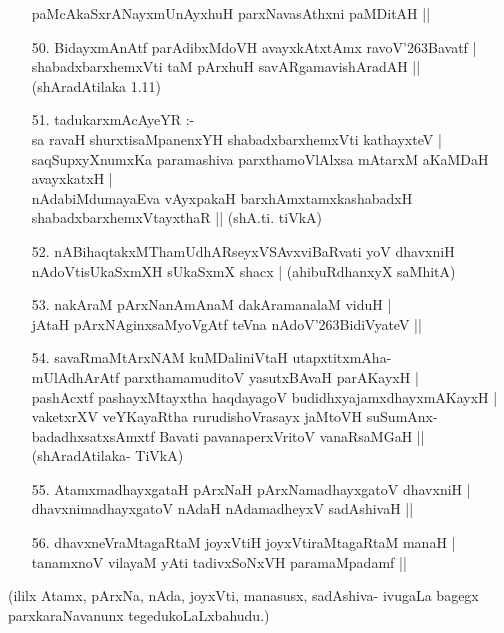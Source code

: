 \begin{itemize}
paMcAkaSxrANayxmUnAyxhuH parxNavasAthxni paMDitAH ||\label{161}
\item[50.] BidayxmAnAtf parAdibxMdoVH avayxkAtxtAmx ravoV\char'263Bavatf |\\\label{151}
shabadxbarxhemxVti taM pArxhuH savARgamavishAradAH ||
\hfill{(shAradAtilaka 1.11)}
\item[51.] tadukarxmAcAyeYR :-\\
sa ravaH shurxtisaMpanenxYH shabadxbarxhemxVti kathayxteV |\\\label{151}
saqSupxyXnumxKa paramashiva parxthamoVlAlxsa mAtarxM aKaMDaH avayxkatxH |\\
nAdabiMdumayaEva vAyxpakaH barxhAmxtamxkashabadxH shabadxbarxhemxVtayxthaR ||
\hfill{(shA.ti. tiVkA)}
\item[52.] nABihaqtakxMThamUdhARseyxVSAvxviBaRvati yoV dhavxniH \\\label{151}
nAdoVtisUkaSxmXH sUkaSxmX shacx |
\hfill{(ahibuRdhanxyX saMhitA)}
\item[53.] nakAraM pArxNanAmAnaM dakAramanalaM viduH |\\\label{151}
jAtaH pArxNAginxsaMyoVgAtf teVna nAdoV\char'263BidiVyateV ||
\item[54.] savaRmaMtArxNAM kuMDaliniVtaH utapxtitxmAha-\\
mUlAdhArAtf parxthamamuditoV yasutxBAvaH parAKayxH |\\\label{152}
pashAcxtf pashayxMtayxtha haqdayagoV budidhxyajamxdhayxmAKayxH |\\
vaketxrXV veYKayaRtha rurudishoVrasayx jaMtoVH suSumAnx-\\
badadhxsatxsAmxtf Bavati pavanaperxVritoV vanaRsaMGaH ||
\hfill{(shAradAtilaka- TiVkA)}
\item[55.] AtamxmadhayxgataH pArxNaH pArxNamadhayxgatoV dhavxniH |\\\label{152}
dhavxnimadhayxgatoV nAdaH nAdamadheyxV sadAshivaH ||
\item[56.] dhavxneVraMtagaRtaM joyxVtiH joyxVtiraMtagaRtaM manaH |\\
tanamxnoV vilayaM yAti tadivxSoNxVH paramaMpadamf ||
\end{itemize}

(ililx Atamx, pArxNa, nAda, joyxVti, manasusx, sadAshiva- ivugaLa bagegx parxkaraNavanunx tegedukoLaLxbahudu.)

